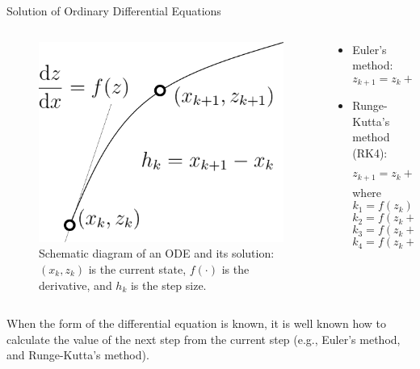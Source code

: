 \documentclass[9pt]{beamer}
\newcounter{frame}[frame]
\begin{document}
\begin{frame}{Solution of Ordinary Differential Equations}
\begin{columns}
\begin{column}{0.5\textwidth}
\begin{figure}
	\includegraphics[height=.4\textheight]{ODEfigure}
	\caption{Schematic diagram of an ODE and its solution: $(x_k,z_k)$ is the current state, $f(\cdot)$ is the derivative, and $h_k$ is the step size.}
\end{figure}
\end{column}
\begin{column}{0.5\textwidth}  %
\begin{itemize}
	\item Euler's method: 
	\[z_{k+1} = z_k + h_k f(z_k)\]
	\item Runge-Kutta's method (RK4):
	\[z_{k+1} = z_k + \frac{h_k}{6}(k_1 + 2k_2 + 3k_2 + k_4)\]
	\noindent where
	\[k_1 = f(z_k)\]
	\[k_2 = f(z_k + h_k k_1/2)\]
	\[k_3 = f(z_k + h_k k_2/2)\]
	\[k_4 = f(z_k + h_k k_3)\]
\end{itemize}
\end{column}
\end{columns}
\vspace{.5cm}
When the form of the differential equation is known, it is well known how to calculate the value of the next step from the current step (e.g., Euler's method, and Runge-Kutta's method).
\end{frame}
\end{document}
